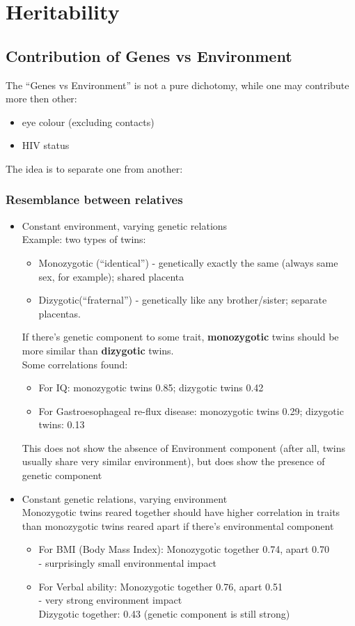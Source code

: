 \documentclass{scrartcl}
\begin{document}
\section{Heritability}
\label{sec:05-0}
\subsection{Contribution of Genes vs Environment}
\label{sec:05-1}
The ``Genes vs Environment'' is not a pure dichotomy, while one may contribute more then other:
\begin{itemize}
\item eye colour (excluding contacts)
\item HIV status
\end{itemize}
The idea is to separate one from another:
\subsubsection{Resemblance between relatives}
\label{sec:5-1-0533}
\begin{itemize}
\item Constant environment, varying genetic relations\\
  Example: two types of twins:
  \begin{itemize}
  \item Monozygotic (``identical'') - genetically exactly the same (always same sex, for example); shared placenta
  \item Dizygotic(``fraternal'') - genetically like any brother/sister; separate placentas.
  \end{itemize}
  If there's genetic component to some trait, {\bf monozygotic} twins should be more similar than {\bf dizygotic} twins.\\
  Some correlations found:
  \begin{itemize}
  \item For IQ: monozygotic twins 0.85; dizygotic twins 0.42
  \item For Gastroesophageal re-flux disease: monozygotic twins 0.29; dizygotic twins: 0.13
  \end{itemize}
  This does not show the absence of Environment component (after all, twins usually share very similar environment), but does show the presence of genetic component
\item Constant genetic relations, varying  environment\\
  Monozygotic twins reared together should have higher correlation in traits than monozygotic twins reared apart if there's environmental component
  \begin{itemize}
  \item For BMI (Body Mass Index): Monozygotic together 0.74, apart 0.70\\
    - surprisingly small environmental impact
  \item For Verbal ability: Monozygotic together 0.76, apart 0.51\\
    - very strong environment impact\\
    Dizygotic together: 0.43 (genetic component is still strong)
  \end{itemize}
\end{itemize}
\end{document}
